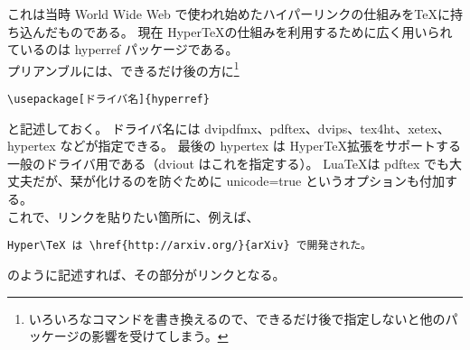 これは当時 World Wide Web で使われ始めたハイパーリンクの仕組みを\TeX{}に持ち込んだものである。
現在 Hyper\TeX{}の仕組みを利用するために広く用いられているのは hyperref パッケージである。\\

プリアンブルには、できるだけ後の方に\footnote{いろいろなコマンドを書き換えるので、できるだけ後で指定しないと他のパッケージの影響を受けてしまう。}
\begin{mdframed}[roundcorner=0.50zw,leftmargin=3.00zw,rightmargin=3.00zw,skipabove=0.40zw,skipbelow=0.40zw,innertopmargin=4.00pt,innerbottommargin=4.00pt,innerleftmargin=5.00pt,innerrightmargin=5.00pt,linecolor=gray!020,linewidth=0.50pt,backgroundcolor=gray!20]
\begin{verbatim}
\usepackage[ドライバ名]{hyperref}
\end{verbatim}
\end{mdframed}
と記述しておく。
ドライバ名には dvipdfmx、pdftex、dvips、tex4ht、xetex、hypertex などが指定できる。
最後の hypertex は Hyper\TeX{}拡張をサポートする一般のドライバ用である（dviout はこれを指定する）。
Lua\TeX{}は pdftex でも大丈夫だが、栞が化けるのを防ぐために unicode=true というオプションも付加する。\\

これで、リンクを貼りたい箇所に、例えば、
\begin{mdframed}[roundcorner=0.50zw,leftmargin=3.00zw,rightmargin=3.00zw,skipabove=0.40zw,skipbelow=0.40zw,innertopmargin=4.00pt,innerbottommargin=4.00pt,innerleftmargin=5.00pt,innerrightmargin=5.00pt,linecolor=gray!020,linewidth=0.50pt,backgroundcolor=gray!20]
\begin{verbatim}
Hyper\TeX は \href{http://arxiv.org/}{arXiv} で開発された。
\end{verbatim}
\end{mdframed}
のように記述すれば、その部分がリンクとなる。\\

